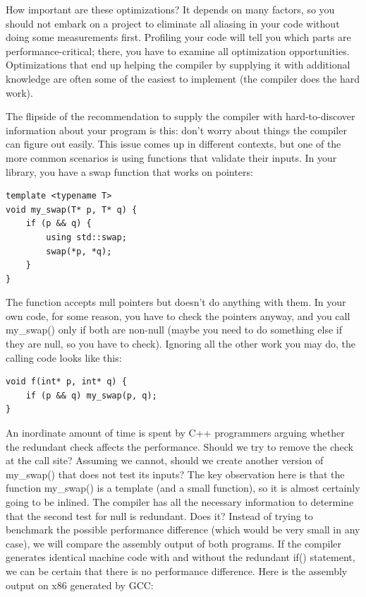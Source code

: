 How important are these optimizations? It depends on many factors, so you should not embark on a project to eliminate all aliasing in your code without doing some measurements first. Profiling your code will tell you which parts are performance-critical; there, you have to examine all optimization opportunities. Optimizations that end up helping the compiler by supplying it with additional knowledge are often some of the easiest to implement (the compiler does the hard work). 

The flipside of the recommendation to supply the compiler with hard-to-discover information about your program is this: don't worry about things the compiler can figure out easily. This issue comes up in different contexts, but one of the more common scenarios is using functions that validate their inputs. In your library, you have a swap function that works on pointers:

\begin{lstlisting}[style=styleCXX]
template <typename T>
void my_swap(T* p, T* q) {
	if (p && q) {
		using std::swap;
		swap(*p, *q);
	}
}
\end{lstlisting}

The function accepts null pointers but doesn't do anything with them. In your own code, for some reason, you have to check the pointers anyway, and you call my\_swap() only if both are non-null (maybe you need to do something else if they are null, so you have to check). Ignoring all the other work you may do, the calling code looks like this:

\begin{lstlisting}[style=styleCXX]
void f(int* p, int* q) {
	if (p && q) my_swap(p, q);
}
\end{lstlisting}

An inordinate amount of time is spent by C++ programmers arguing whether the redundant check affects the performance. Should we try to remove the check at the call site? Assuming we cannot, should we create another version of my\_swap() that does not test its inputs? The key observation here is that the function my\_swap() is a template (and a small function), so it is almost certainly going to be inlined. The compiler has all the necessary information to determine that the second test for null is redundant. Does it? Instead of trying to benchmark the possible performance difference (which would be very small in any case), we will compare the assembly output of both programs. If the compiler generates identical machine code with and without the redundant if() statement, we can be certain that there is no performance difference. Here is the assembly output on x86 generated by GCC:

